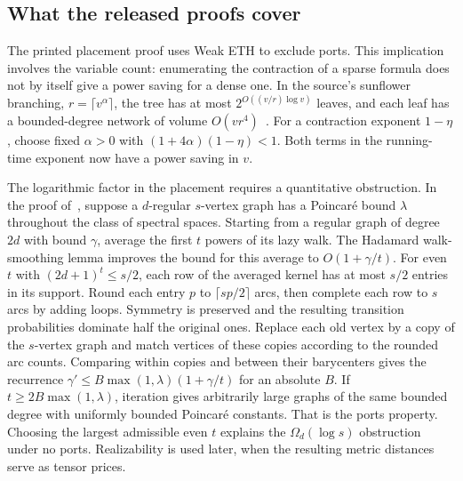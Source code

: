\documentclass[11pt]{article}
\begin{document}
\subsection{What the released proofs cover}

The printed placement proof uses Weak ETH to exclude ports.
This implication involves the variable count: enumerating the contraction
of a sparse formula does not by itself give a power saving for a dense
one. In the source's sunflower branching, $r=\lceil v^\alpha\rceil$,
the tree has at most $2^{O((v/r)\log v)}$ leaves, and each leaf has
a bounded-degree network of volume $O(vr^4)$~\cite{expansion}.
For a contraction exponent $1-\eta$, choose fixed $\alpha>0$ with
$(1+4\alpha)(1-\eta)<1$. Both terms in the running-time exponent now
have a power saving in $v$.

The logarithmic factor in the placement requires a quantitative
obstruction. In the proof of~\cite{loggraph}, suppose a $d$-regular
$s$-vertex graph has a Poincar\'e bound $\lambda$ throughout the class
of spectral spaces. Starting from a regular graph of degree $2d$ with
bound $\gamma$, average the first $t$ powers of its lazy walk. The
Hadamard walk-smoothing lemma improves the bound for this average to
$O(1+\gamma/t)$. For even $t$ with $(2d+1)^t\le s/2$, each row of
the averaged kernel has at most $s/2$ entries in its support. Round
each entry $p$ to $\lceil sp/2\rceil$ arcs, then complete each row
to $s$ arcs by adding loops. Symmetry is preserved and the resulting
transition probabilities dominate half the original ones. Replace
each old vertex by a copy of the $s$-vertex graph and match vertices
of these copies according to the rounded arc counts. Comparing within
copies and between their barycenters gives the recurrence
$\gamma'\le B\max(1,\lambda)(1+\gamma/t)$ for an absolute $B$.
If $t\ge2B\max(1,\lambda)$, iteration gives arbitrarily large graphs
of the same bounded degree with uniformly bounded Poincar\'e constants.
That is the ports property. Choosing the largest admissible even $t$
explains the $\Omega_d(\log s)$ obstruction under no ports. Realizability
is used later, when the resulting metric distances serve as tensor prices.
\end{document}
